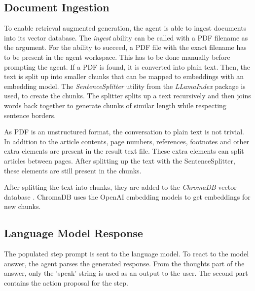 \documentclass[../main.tex]{subfiles}
\begin{document}
\subsection{Document Ingestion}

To enable retrieval augmented generation,
the agent is able to ingest documents into its vector database.
The \emph{ingest} ability can be called with a PDF filename as the argument.
For the ability to succeed, a PDF file with the exact filename has to be present
in the agent workspace.
This has to be done manually before prompting the agent.
If a PDF is found, it is converted into plain text.
Then, the text is split up into smaller chunks that can be mapped to embeddings
with an embedding model.
The \emph{SentenceSplitter} utility from the \emph{LLamaIndex} package \cite{zotero-255} is used,
to create the chunks.
The splitter splits up a text recursively and then joins words back together to
generate chunks of similar length while respecting sentence borders.

As PDF is an unstructured format, the conversation to plain text is not trivial.
In addition to the article contents, page numbers, references, footnotes and other
extra elements are present in the result text file.
These extra elements can split articles between pages.
After splitting up the text with the SentenceSplitter, these elements are still
present in the chunks.

After splitting the text into chunks, they are added to the \emph{ChromaDB}
vector database \cite{zotero-176}.
ChromaDB uses the OpenAI embedding models \cite{zotero-253} to get embeddings for new chunks.

\subsection{Language Model Response}

The populated step prompt is sent to the language model.
To react to the model answer, the agent parses the generated response.
From the thoughts part of the answer, only the 'speak' string is used as an output to the user.
The second part contains the action proposal for the step.
\end{document}
